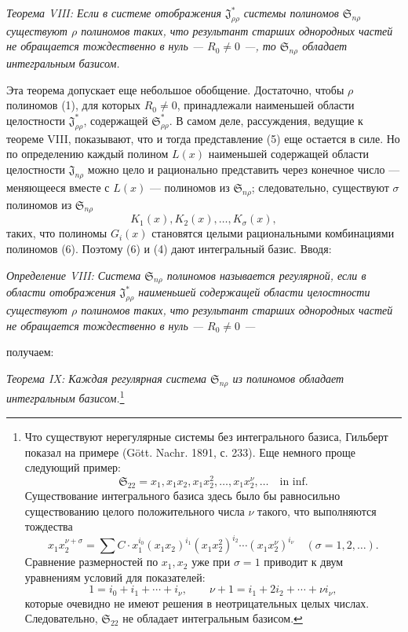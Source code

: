 \documentclass[11pt]{article}
\providecommand{\Ssys}{\mathfrak{S}}
\providecommand{\Jdom}{\mathfrak{J}}
\begin{document}
\emph{Теорема VIII: Если в системе отображения $\Jdom^*_{\rho\rho}$ системы полиномов $\Ssys_{n\rho}$ существуют $\rho$ полиномов таких, что результант старших однородных частей не обращается тождественно в нуль --- $R_0\ne0$ ---, то $\Ssys_{n\rho}$ обладает интегральным базисом.}

Эта теорема допускает еще небольшое обобщение. Достаточно, чтобы $\rho$ полиномов (1), для которых $R_0\ne0$, принадлежали наименьшей области целостности $\Jdom^*_{\rho\rho}$, содержащей $\Ssys^*_{\rho\rho}$. В самом деле, рассуждения, ведущие к теореме VIII, показывают, что и тогда представление (5) еще остается в силе. Но по определению каждый полином $L(x)$ наименьшей содержащей области целостности $\Jdom_{n\rho}$ можно цело и рационально представить через конечное число --- меняющееся вместе с $L(x)$ --- полиномов из $\Ssys_{n\rho}$; следовательно, существуют $\sigma$ полиномов из $\Ssys_{n\rho}$
\begin{equation}
  K_1(x),K_2(x),\ldots,K_\sigma(x),
\tag{6}
\end{equation}
таких, что полиномы $G_i(x)$ становятся целыми рациональными комбинациями полиномов (6). Поэтому (6) и (4) дают интегральный базис. Вводя:

\emph{Определение VIII: Система $\Ssys_{n\rho}$ полиномов называется регулярной, если в области отображения $\Jdom^*_{\rho\rho}$ наименьшей содержащей области целостности существуют $\rho$ полиномов таких, что результант старших однородных частей не обращается тождественно в нуль --- $R_0\ne0$ ---}

получаем:

\emph{Теорема IX: Каждая регулярная система $\Ssys_{n\rho}$ из полиномов обладает интегральным базисом.}\footnote{Что существуют нерегулярные системы без интегрального базиса, Гильберт показал на примере (Gött. Nachr. 1891, с. 233). Еще немного проще следующий пример:
\[
  \Ssys_{22}=x_1,
  x_1x_2,
  x_1x_2^2,
  \ldots,
  x_1x_2^\nu,
  \ldots\quad\text{in inf.}
\]
Существование интегрального базиса здесь было бы равносильно существованию целого положительного числа $\nu$ такого, что выполняются тождества
\[
  x_1x_2^{\nu+\sigma}=\sum C\cdot x_1^{i_0}(x_1x_2)^{i_1}(x_1x_2^2)^{i_2}\cdots(x_1x_2^\nu)^{i_\nu}
  \quad(\sigma=1,2,\ldots).
\]
Сравнение размерностей по $x_1,x_2$ уже при $\sigma=1$ приводит к двум уравнениям условий для показателей:
\[
  1=i_0+i_1+\cdots+i_\nu,
  \qquad
  \nu+1=i_1+2i_2+\cdots+\nu i_\nu,
\]
которые очевидно не имеют решения в неотрицательных целых числах. Следовательно, $\Ssys_{22}$ не обладает интегральным базисом.}
\end{document}
